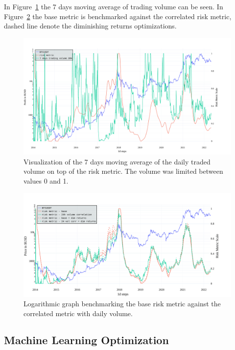 In Figure~\ref{figure-24volume-7sma} the 7 days moving average of trading volume can be seen. In Figure~\ref{figure-24volume-riskmetric} the base metric is benchmarked against the correlated risk metric, dashed line denote the diminishing returns optimizations.

\begin{figure}[!t]
    \centering
    \includegraphics[width=\columnwidth]{figures/24volume-7sma.pdf}
    \caption{Visualization of the 7 days moving average of the daily traded volume on top of the risk metric. The volume was limited between values 0 and 1.}
    \label{figure-24volume-7sma}
\end{figure}

\begin{figure}[!t]
    \centering
    \includegraphics[width=\columnwidth]{figures/24volume-riskmetric.pdf}
    \caption{Logarithmic graph benchmarking the base risk metric against the correlated metric with daily volume.}
    \label{figure-24volume-riskmetric}
\end{figure}


\subsection*{Machine Learning Optimization}
\label{subsection-ml-optimization}

